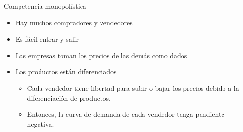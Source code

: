 \documentclass{beamer}
\begin{document}
\begin{frame}{Competencia monopolística}
\begin{itemize}
    \item Hay muchos compradores y vendedores\vspace{2mm}
    \item Es fácil entrar y salir\vspace{2mm}
    \item Las empresas toman los precios de las demás como dados\vspace{2mm}
    \item Los productos están diferenciados\vspace{2mm}
    \begin{itemize}
        \item Cada vendedor tiene libertad para subir o bajar los precios debido a la diferenciación de productos.\vspace{1mm}
        \item Entonces, la curva de demanda de cada vendedor tenga pendiente negativa.
    \end{itemize}
    \end{itemize}
\end{frame}
\end{document}
